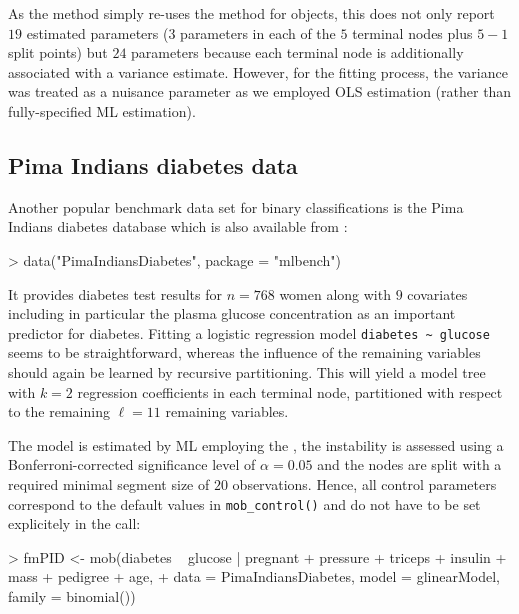 \documentclass{Z}
\begin{document}
As the  method simply re-uses the method for  objects,
this does not only report $19$ estimated parameters ($3$ parameters in
each of the $5$ terminal nodes plus $5 - 1$ split points) but
$24$ parameters because each terminal node is additionally associated with a 
variance estimate. However, for the fitting process, the variance was treated as a nuisance 
parameter as we employed OLS estimation (rather than fully-specified ML estimation). 


\subsection{Pima Indians diabetes data}

Another popular benchmark data set for binary classifications is the Pima Indians
diabetes database which is also available from :

\begin{Schunk}
\begin{Sinput}
> data("PimaIndiansDiabetes", package = "mlbench")
\end{Sinput}
\end{Schunk}

It provides diabetes test results for $n = 768$ women
along with $9$ covariates including in particular
the plasma glucose concentration  as an important predictor for diabetes.
Fitting a logistic regression model \verb:diabetes ~ glucose: seems to be straightforward,
whereas the influence of the remaining variables should again be learned by recursive
partitioning. This will yield a model tree with $k = 2$ regression coefficients in each terminal
node, partitioned with respect to the remaining $\ell = 11$ remaining variables.

The model is estimated by ML employing the , 
the instability is assessed using a Bonferroni-corrected
significance level of $\alpha = 0.05$ and the nodes are split with a required minimal
segment size of $20$ observations. Hence, all control parameters correspond to the
default values in \verb:mob_control(): and do not have to be set explicitely in 
the  call:

\begin{Schunk}
\begin{Sinput}
> fmPID <- mob(diabetes ~ glucose | pregnant + pressure + triceps + insulin + mass + pedigree + age,
+   data = PimaIndiansDiabetes, model = glinearModel, family = binomial())
\end{Sinput}
\end{Schunk}
\end{document}

